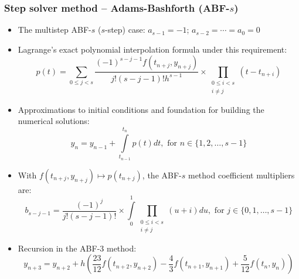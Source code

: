 \documentclass[usenames,svgnames,dvipsnames,10pt]{beamer}
\begin{document}
\begin{frame}
\frametitle{Step solver method -- Adams-Bashforth (ABF-$s$)}

\small 
\begin{itemize} 

\item The multistep ABF-$s$ ($s$-step) case: $a_{s-1}=-1$; $a_{s-2}=\cdots=a_0=0$
\item Lagrange's exact polynomial interpolation formula under this requirement: 
      $$p(t) = \sum\limits_{0 \leq j < s} \frac{(-1)^{s-j-1} f(t_{n+j}, y_{n+j})}{j! (s-j-1)! h^{s-1}} \times 
       \prod\limits_{\substack{0 \leq i < s \\ i \neq j}} (t-t_{n+i})$$ 
\item Approximations to initial conditions and foundation for building the numerical solutions: 
      $$y_{n} = y_{n-1} + \int\limits_{t_{n-1}}^{t_{n}} p(t) dt, \text{ for } n \in \{1, 2, \ldots, s-1\}$$ 
\item With $f(t_{n+j}, y_{n+j}) \mapsto p(t_{n+j})$, the ABF-$s$ method coefficient multipliers are: 
      $$b_{s-j-1} = \frac{(-1)^j}{j!(s-j-1)!} \times \int\limits_0^1 \prod\limits_{\substack{0 \leq i < s \\ i \neq j}} (u+i) du, 
       \text{ for } j \in \{0,1,\ldots,s-1\}$$ 
\item Recursion in the ABF-3 method: 
      $$y_{n+3} = y_{n+2} + h\left(\frac{23}{12}f(t_{n+2},y_{n+2}) - \frac{4}{3} f(t_{n+1},y_{n+1}) + \frac{5}{12} f(t_n, y_n)\right)$$ 

\end{itemize} 

\end{frame}
\end{document}
